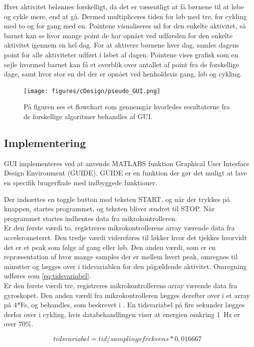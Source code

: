 Hver aktivitet belønnes forskelligt, da det er væsentligt at få børnene til at løbe og cykle mere, end at gå. Dermed multipliceres tiden for løb med tre, for cykling med to og for gang med en. Pointene visualiseres ud for den enkelte aktivitet, så barnet kan se hvor mange point de har opnået ved udførslen for den enkelte aktivitet igennem en hel dag. For at aktivere børnene hver dag, samles dagens point for alle aktiviteter udført i løbet af dagen. Pointene vises grafisk som en søjle hvormed barnet kan få et overblik over antallet af point fra de forskellige dage, samt hvor stor en del der er opnået ved henholdsvis gang, løb og cykling.  

\begin{figure}[H]
	\centering
	\texttt{[image: figures/cDesign/pseudo\_GUI.png]}
	\caption{På figuren ses et flowchart som gennemgår hvorledes resultaterne fra de forskellige algoritmer behandles af GUI.}
	\label{fig:GUI}
\end{figure}

\subsection{Implementering}
GUI implementeres ved at anvende MATLABS funktion Graphical User Interface Design Environment (GUIDE). GUIDE er en funktion der gør det muligt at lave en specifik brugerflade med indbyggede funktioner.

Der indsættes en toggle button med teksten START, og når der trykkes på knappen, startes programmet, og teksten bliver ændret til STOP. Når programmet startes indhentes data fra mikrokontrolleren. \\
Er den første værdi to, registreres mikrokontrollerens array værende data fra accelerometeret. Den tredje værdi videreføres til løkker hvor det tjekkes hvorvidt det er et peak som følge af gang eller løb. Den anden værdi, som er en repræsentation af hvor mange samples der er mellem hvert peak, omregnes til minutter og lægges over i tidsvariablen for den pågældende aktivitet. Omregning udføres som \eqref{eq:tidsvariabel}. \\
Er den første værdi tre, registreres mikrokontrollerens array værende data fra gyroskopet. Den anden værdi fra mikrokontrolleren lægges derefter over i et array på 4*Fs, og behandles, som beskrevet i . En tidsvariabel på fire sekunder lægges derfor over i cykling, hvis databehandlingen viser at energien omkring 1~Hz er over 70\%. 

\begin{equation}
\label{eq:tidsvariabel}
	tidsvariabel = tid/samplingsfrekvens*0,016667
\end{equation}

